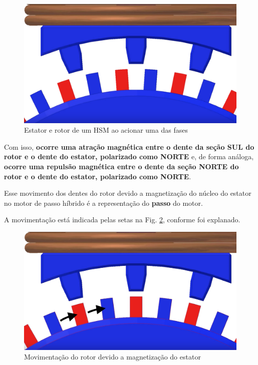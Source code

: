 	\begin{figure}[H]
		\centering 
		\includegraphics[scale=0.16]{images/hsm_operation/visaopasso2}
		\caption{Estator e rotor de um HSM ao acionar uma das fases}
		\label{passo2}
	\end{figure}
	
	Com isso, \textbf{ocorre uma atração magnética entre o dente da seção SUL do rotor e o dente do estator, polarizado como NORTE} e, de forma análoga, \textbf{ocorre uma repulsão magnética entre o dente da seção NORTE do rotor e o dente do estator, polarizado como NORTE}.
	
	Esse movimento dos dentes do rotor devido a magnetização do núcleo do estator no motor de passo híbrido é a representação do \textbf{passo} do motor.
	
	A movimentação está indicada pelas setas na Fig. \ref{passo3}, conforme foi explanado.
	
	\begin{figure}[H]
		\centering 
		\includegraphics[scale=0.13]{images/hsm_operation/visaopasso3}
		\caption{Movimentação do rotor devido a magnetização do estator}
		\label{passo3}
	\end{figure}  
	
